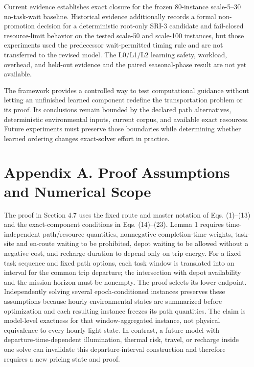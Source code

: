 \documentclass[
  11pt,
]{article}
\begin{document}
Current evidence establishes exact closure for the frozen 80-instance
scale-5--30 no-task-wait baseline. Historical evidence additionally
records a formal non-promotion decision for a deterministic root-only
SRI-3 candidate and fail-closed resource-limit behavior on the tested
scale-50 and scale-100 instances, but those experiments used the
predecessor wait-permitted timing rule and are not transferred to the
revised model. The L0/L1/L2 learning safety, workload, overhead, and
held-out evidence and the paired seasonal-phase result are not yet
available.

The framework provides a controlled way to test computational guidance
without letting an unfinished learned component redefine the
transportation problem or its proof. Its conclusions remain bounded by
the declared path alternatives, deterministic environmental inputs,
current corpus, and available exact resources. Future experiments must
preserve those boundaries while determining whether learned ordering
changes exact-solver effort in practice.

\hypertarget{appendix-a.-proof-assumptions-and-numerical-scope}{%
\section{Appendix A. Proof Assumptions and Numerical
Scope}\label{appendix-a.-proof-assumptions-and-numerical-scope}}

The proof in Section 4.7 uses the fixed route and master notation of
Eqs. (1)--(13) and the exact-component conditions in Eqs. (14)--(23).
Lemma 1 requires time-independent path/resource quantities, nonnegative
completion-time weights, task-site and en-route waiting to be
prohibited, depot waiting to be allowed without a negative cost, and
recharge duration to depend only on trip energy. For a fixed task
sequence and fixed path options, each task window is translated into an
interval for the common trip departure; the intersection with depot
availability and the mission horizon must be nonempty. The proof selects
its lower endpoint. Independently solving several epoch-conditioned
instances preserves these assumptions because hourly environmental
states are summarized before optimization and each resulting instance
freezes its path quantities. The claim is model-level exactness for that
window-aggregated instance, not physical equivalence to every hourly
light state. In contrast, a future model with departure-time-dependent
illumination, thermal risk, travel, or recharge inside one solve can
invalidate this departure-interval construction and therefore requires a
new pricing state and proof.
\end{document}
